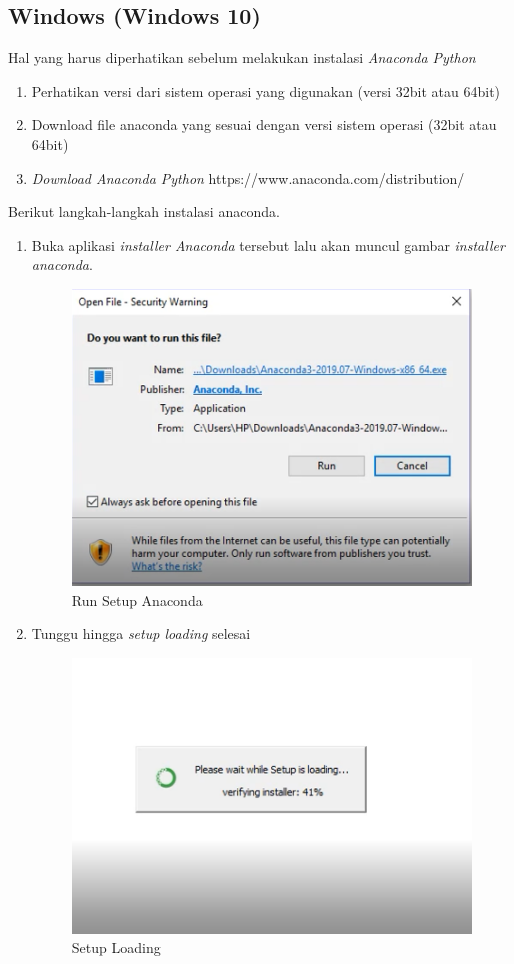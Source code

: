 \subsection{Windows (Windows 10)}
Hal yang harus diperhatikan sebelum melakukan instalasi \textit{Anaconda Python}
\begin{enumerate}
 \item Perhatikan versi dari sistem operasi yang digunakan (versi 32bit atau 64bit)
 \item Download file anaconda yang sesuai dengan versi sistem operasi (32bit atau 64bit)
 \item \textit{Download Anaconda Python} https://www.anaconda.com/distribution/
\end{enumerate}

Berikut langkah-langkah instalasi anaconda.
\begin{enumerate}
\item Buka aplikasi \textit{installer Anaconda} tersebut lalu akan muncul  gambar \textit{installer anaconda}.
\begin{figure}[H]
        \centerline{\includegraphics[scale=0.5]{figures/1}}
        \caption{Run Setup Anaconda}
		\label{langkah1}
\end{figure}

\item Tunggu hingga \textit{setup loading} selesai
\begin{figure}[H]
        \centerline{\includegraphics[scale=0.5]{figures/2}}
        \caption{Setup Loading}
		\label{langkah2}
\end{figure}



\end{enumerate}
